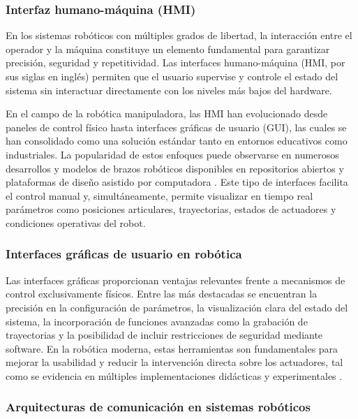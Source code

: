 \subsubsection{Interfaz humano-máquina (HMI)}

En los sistemas robóticos con múltiples grados de libertad, la interacción entre el operador y la máquina constituye un elemento fundamental para garantizar precisión, seguridad y repetitividad. Las interfaces humano-máquina (HMI, por sus siglas en inglés) permiten que el usuario supervise y controle el estado del sistema sin interactuar directamente con los niveles más bajos del hardware.

En el campo de la robótica manipuladora, las HMI han evolucionado desde paneles de control físico hasta interfaces gráficas de usuario (GUI), las cuales se han consolidado como una solución estándar tanto en entornos educativos como industriales. La popularidad de estos enfoques puede observarse en numerosos desarrollos y modelos de brazos robóticos disponibles en repositorios abiertos y plataformas de diseño asistido por computadora \cite{grabcad_robot_arm_6dof, grabcad_robotic_arm_216}. Este tipo de interfaces facilita el control manual y, simultáneamente, permite visualizar en tiempo real parámetros como posiciones articulares, trayectorias, estados de actuadores y condiciones operativas del robot.

\subsubsection{Interfaces gráficas de usuario en robótica}

Las interfaces gráficas proporcionan ventajas relevantes frente a mecanismos de control exclusivamente físicos. Entre las más destacadas se encuentran la precisión en la configuración de parámetros, la visualización clara del estado del sistema, la incorporación de funciones avanzadas como la grabación de trayectorias y la posibilidad de incluir restricciones de seguridad mediante software. En la robótica moderna, estas herramientas son fundamentales para mejorar la usabilidad y reducir la intervención directa sobre los actuadores, tal como se evidencia en múltiples implementaciones didácticas y experimentales \cite{youtube_robot_arm_control, robodacta_mini_arm_joystick}.

\subsubsection{Arquitecturas de comunicación en sistemas robóticos}

